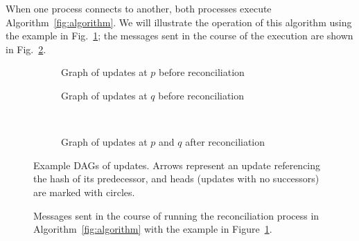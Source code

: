 \documentclass[a4paper,anonymous,USenglish]{lipics-v2019}
\begin{document}
When one process connects to another, both processes execute Algorithm~\ref{fig:algorithm}.
We will illustrate the operation of this algorithm using the example in Fig.~\ref{fig:example-dags}; the messages sent in the course of the execution are shown in Fig.~\ref{fig:messages}.

\begin{figure}[p]
    \centering
    \begin{subfigure}{0.45\textwidth}
    
    \caption{Graph of updates at $p$ before reconciliation}
    \end{subfigure}\hfill
    \begin{subfigure}{0.45\textwidth}
    
    \caption{Graph of updates at $q$ before reconciliation}
    \end{subfigure}\\[10pt]
    \begin{subfigure}{0.4\textwidth}
    
    \caption{Graph of updates at $p$ and $q$ after reconciliation}
    \end{subfigure}
    \caption{Example DAGs of updates. Arrows represent an update referencing the hash of its predecessor, and heads (updates with no successors) are marked with circles.}
    \label{fig:example-dags}
\end{figure}

\begin{figure}[p]
    
    \caption{Messages sent in the course of running the reconciliation process in Algorithm~\ref{fig:algorithm} with the example in Figure~\ref{fig:example-dags}.}
    \label{fig:messages}
\end{figure}
\end{document}
